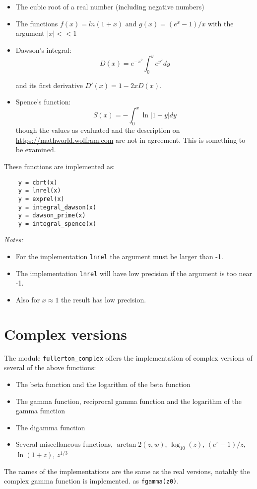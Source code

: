\documentclass{article}
\begin{document}
\begin{itemize}
\item
The cubic root of a real number (including negative numbers)
\item
The functions $f(x) = ln(1+x)$ and $g(x) = (e^x-1)/x$ with the argument $|x| << 1$
\item
Dawson's integral:
\begin{equation}
     D(x) = e^{-x^2} \int^y_0 e^{y^2} dy
\end{equation}

\noindent and its first derivative $D'(x) = 1 - 2 x D(x)$.
\item
Spence's function:
\begin{equation}
     S(x) = - \int^x_0 \ln |1-y| dy
\end{equation}
\noindent though the values as evaluated and the description on \url{https://mathworld.wolfram.com} are
not in agreement. This is something to be examined.
\end{itemize}

These functions are implemented as:
\begin{verbatim}
    y = cbrt(x)
    y = lnrel(x)
    y = exprel(x)
    y = integral_dawson(x)
    y = dawson_prime(x)
    y = integral_spence(x)
\end{verbatim}

\emph{Notes:}
\begin{itemize}
\item
For the implementation \verb+lnrel+ the argument must be larger than -1.
\item
The implementation \verb+lnrel+ will have low precision if the argument is too near -1.
\item
Also for $x \approx 1$ the result has low precision.
\end{itemize}


\section{Complex versions}
The module \verb+fullerton_complex+ offers the implementation of complex versions of several of the above functions:
\begin{itemize}
\item The beta function and the logarithm of the beta function
\item The gamma function, reciprocal gamma function and the logarithm of the gamma function
\item The digamma function
\item Several miscellaneous functions, $\arctan2(z,w)$, $\log_{10}(z)$, $(e^{z}-1)/z$, $\ln(1+z)$, $z^{1/3}$
\end{itemize}

The names of the implementations are the same as the real versions, notably the complex gamma function is implemented.
as \verb+fgamma(z0)+.
\end{document}
